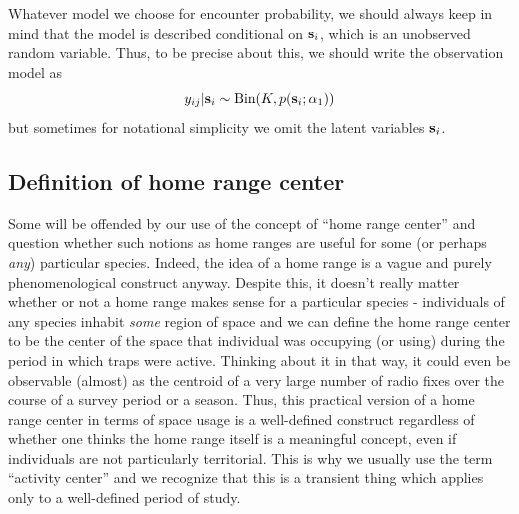 Whatever model we choose for encounter probability, we should always keep
in mind that the model is described conditional on ${\bf s}_{i}$,
which is an unobserved random variable.  Thus, to be precise about
this, we should write the observation model as
\[
y_{ij}|{\bf s}_{i} \sim \mbox{Bin}(K, p({\bf s}_{i};\alpha_{1}))
\]
but sometimes for notational simplicity we omit the latent variables
${\bf s}_{i}$.

\subsection{Definition of home range center}

Some will be offended by our use of the concept of ``home range
center'' and question whether such notions as home ranges are useful
for some (or perhaps {\it any}) particular species.  Indeed, the idea
of a home range is a vague and purely phenomenological construct
anyway.  Despite this, it doesn't really matter whether or not a home
range makes sense for a particular species - individuals of any
species inhabit {\it some} region of space and we can define the
home range center to be the center of the space that individual
was occupying (or using) during the period in which traps were
active. Thinking about it in that way, it could even be observable
(almost) as the centroid of a very large number of radio fixes over
the course of a survey period or a season.  Thus, this practical
version of a home range center in terms of space usage is a
well-defined construct regardless of whether one thinks the home range
itself is a meaningful concept, even if individuals are not
particularly territorial.  This is why we usually use the term
``activity center'' and we recognize that this is a transient thing
which applies only to a well-defined period of study.


